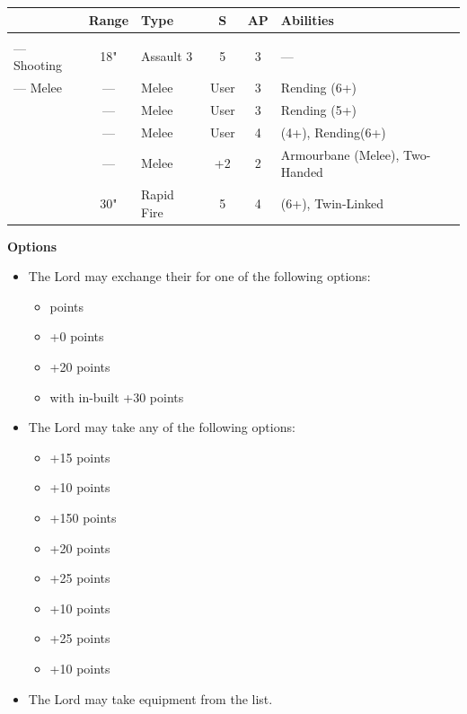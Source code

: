 \begin{minipage}[t]{0.72\textwidth}
	\begin{tabular}{m{90 pt} c C{40pt} *{2}{c} >{\raggedright\arraybackslash}p{130pt}}
		& Range & Type & S & AP & Abilities \\
		\hline
		 & & &  &  &  \\
		— Shooting & 18" & Assault 3 & 5 & 3 & — \\
		— Melee & — & Melee & User & 3 & Rending (6+) \\
		 & — & Melee & User & 3 & Rending (5+) \\
		 & — & Melee & User & 4 &  (4+), Rending(6+) \\
		 & — & Melee & +2 & 2 & Armourbane (Melee), Two-Handed \\
		 & 30" & Rapid Fire & 5 & 4 &  (6+), Twin-Linked \\	
	\end{tabular}
	
	\vspace*{2em}
	\textbf{Options}
	\begin{itemize}
		\item The Lord may exchange their  for one of the following options:
		\begin{itemize}			
			\item {}  points
			\item {} \dotfill +0 points
			\item {} \dotfill +20 points
			\item {} with in-built  \dotfill +30 points
		\end{itemize}
		\item The Lord may take any of the following options:
		\begin{itemize}
			\item {} \dotfill +15 points
			\item {} \dotfill +10 points
			\item {} \dotfill +150 points
			\item {} \dotfill +20 points
			\item {} \dotfill +25 points
			\item {} \dotfill +10 points
			\item {} \dotfill +25 points
			\item {} \dotfill +10 points
		\end{itemize}
		\item The Lord may take equipment from the  list.
	\end{itemize}
\end{minipage}

